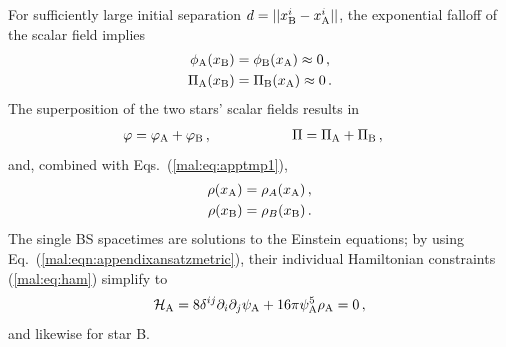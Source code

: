 For sufficiently large initial separation $d=||x_{\rm B}^i
-x_{\rm A}^i||$, the exponential falloff of the scalar field
implies
\begin{equation}
\begin{aligned}
    \phi_{\rm A}(x_{\rm B}) &= \phi_{\rm B}(x_{\rm A}) \approx 0\,, \\
     \Pi_{\rm A}(x_{\rm B}) &= \Pi_{\rm B}(x_{\rm A}) \approx 0\,.
\end{aligned}
\label{mal:eq:apptmp1}
\end{equation}
The superposition of the two stars' scalar fields results in
%
\begin{align}
  &\varphi = \varphi_{\rm A} + \varphi_{\rm B}\,,
  \hspace{0.85cm}~~~~~~~~~~
  \Pi = \Pi_{\rm A} + \Pi_{\rm B}\,,
\end{align}
%
and, combined with Eqs.~(\ref{mal:eq:apptmp1}),
\begin{equation}
\begin{aligned}
  \rho(x_{\rm A}) &= \rho_A(x_{\rm A})\,, \\
  \rho(x_{\rm B}) &= \rho_B(x_{\rm B})\,.
\end{aligned}\label{mal:eqn:energydensityconditon}
\end{equation}
The single BS spacetimes are solutions to the Einstein equations;
by using Eq.~(\ref{mal:eqn:appendixansatzmetric}), their individual
Hamiltonian constraints (\ref{mal:eq:ham}) simplify to
%
\begin{equation}
    \mathcal{H}_{\rm A} = 8 \delta^{ij} \partial_i\partial_j  \psi_{\rm A} +  16\pi \psi_{\rm A}^5\rho_{\rm A} = 0\,,
    \label{mal:eq:hamA}
\end{equation}
%
and likewise for star B.


